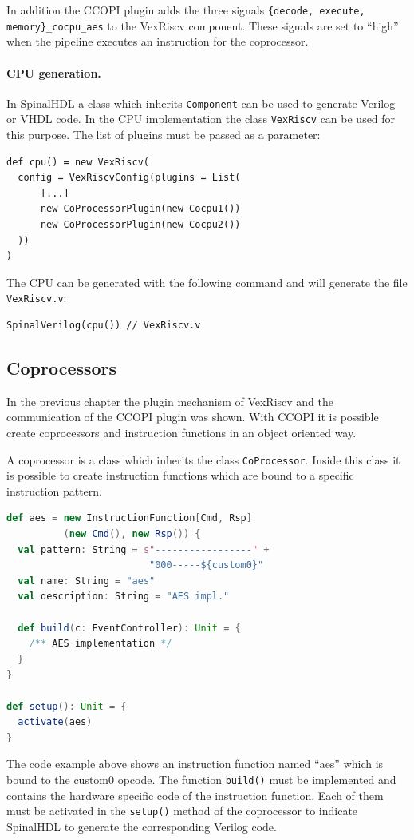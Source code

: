 \documentclass[twoside,twocolumn]{article}
\newcommand{\code}[1]{\texttt{#1}}
\begin{document}
In addition the CCOPI plugin adds the three signals \code{\{decode,
execute, memory\}\_cocpu\_aes} to the VexRiscv component. These signals are
set to ``high'' when the pipeline executes an instruction for the
coprocessor.

\paragraph{CPU generation.} In SpinalHDL a class which inherits
\code{Component} can be used to generate Verilog or VHDL code. In the
CPU implementation the class \code{VexRiscv} can be used for this
purpose. The list of plugins must be passed as a parameter:
\begin{lstlisting}
def cpu() = new VexRiscv(
  config = VexRiscvConfig(plugins = List(
      [...]
      new CoProcessorPlugin(new Cocpu1())
      new CoProcessorPlugin(new Cocpu2())
  ))
)
\end{lstlisting}
The CPU can be generated with the following command and will generate
the file \code{VexRiscv.v}:
\begin{lstlisting}
SpinalVerilog(cpu()) // VexRiscv.v
\end{lstlisting}

\subsection{Coprocessors}
In the previous chapter the plugin mechanism of VexRiscv and the
communication of the CCOPI plugin was shown. With CCOPI it is possible
create coprocessors and instruction functions in an object oriented way.

A coprocessor is a class which inherits the class
\code{CoProcessor}.
Inside this class it is possible to create instruction functions which are
bound to a specific instruction pattern.

\begin{lstlisting}[language=scala]
def aes = new InstructionFunction[Cmd, Rsp]
          (new Cmd(), new Rsp()) {
  val pattern: String = s"-----------------" +
                         "000-----${custom0}"
  val name: String = "aes"
  val description: String = "AES impl."

  def build(c: EventController): Unit = {
    /** AES implementation */
  }
}

def setup(): Unit = {
  activate(aes)
}
\end{lstlisting}
The code example above shows an instruction function named ``aes'' which
is bound to the custom0 opcode. The function \code{build()} must be
implemented and contains the hardware specific code of the instruction
function. Each of them must be activated in the \code{setup()} method 
of the coprocessor to indicate SpinalHDL to generate the corresponding
Verilog code.
\end{document}
